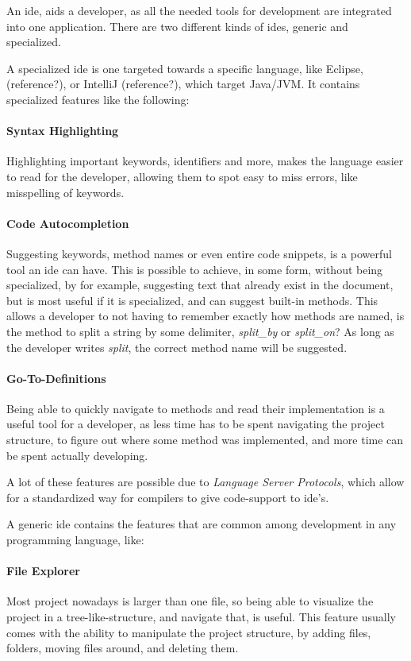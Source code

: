 An \gls{ide}, aids a developer, as all the needed tools for development are
integrated into one application. There are two different kinds of \gls{ide}s,
generic and specialized. 

A specialized \gls{ide} is one targeted towards a specific language, like
Eclipse, (reference?), or IntelliJ (reference?), which target Java/JVM. It
contains specialized features like the following:

\paragraph{Syntax Highlighting} Highlighting important keywords, identifiers
and more, makes the language easier to read for the developer, allowing them to
spot easy to miss errors, like misspelling of keywords.

\paragraph{Code Autocompletion} Suggesting keywords, method names or even entire
code snippets, is a powerful tool an \gls{ide} can have. This is possible to
achieve, in some form, without being specialized, by for example, suggesting
text that already exist in the document, but is most useful if it is
specialized, and can suggest built-in methods. This allows a developer to not
having to remember exactly how methods are named, is the method to split a
string by some delimiter, \textit{split\_by} or \textit{split\_on}? As long as
the developer writes \textit{split}, the correct method name will be suggested.

\paragraph{Go-To-Definitions} Being able to quickly navigate to methods and read
their implementation is a useful tool for a developer, as less time has to be
spent navigating the project structure, to figure out where some method was
implemented, and more time can be spent actually developing.

A lot of these features are possible due to \textit{Language Server Protocols},
which allow for a standardized way for compilers to give code-support to
\gls{ide}'s.

A generic \gls{ide} contains the features that are common among development in
any programming language, like:

\paragraph{File Explorer} Most project nowadays is larger than one file, so
being able to visualize the project in a tree-like-structure, and navigate that,
is useful. This feature usually comes with the ability to manipulate the project
structure, by adding files, folders, moving files around, and deleting them.

